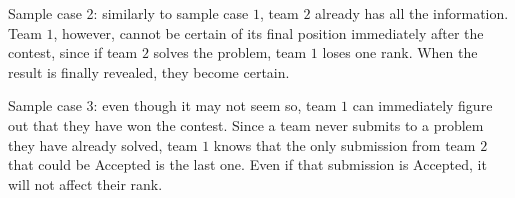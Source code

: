 Sample case 2: similarly to sample case $1$, team $2$ already has all the information.
Team $1$, however, cannot be certain of its final position immediately after the contest,
since if team $2$ solves the problem, team $1$ loses one rank.
When the result is finally revealed, they become certain.

Sample case 3: even though it may not seem so, team $1$ can immediately figure out that they have
won the contest.
Since a team never submits to a problem they have already solved, team $1$ knows that the only
submission from team $2$ that could be Accepted is the last one.
Even if that submission is Accepted, it will not affect their rank.
